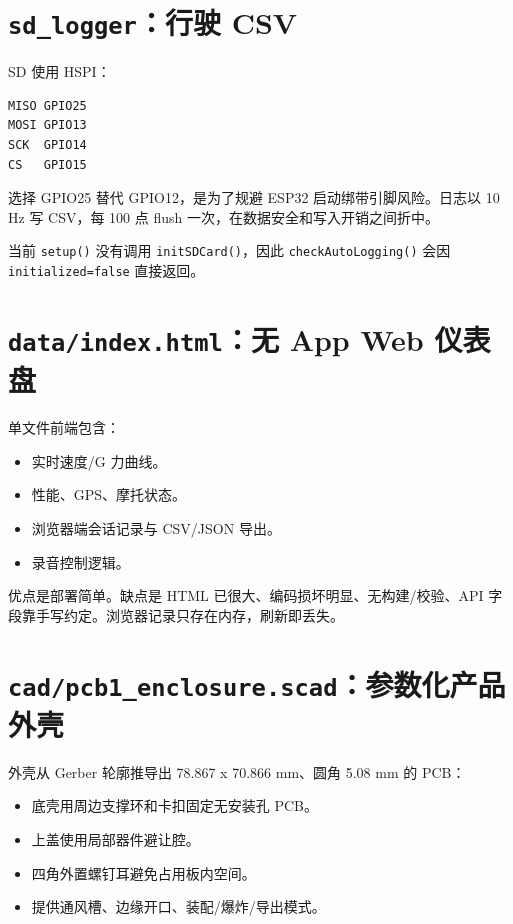 \documentclass[
  UTF8,11pt,a4paper]{ctexart}
\newcommand{\passthrough}[1]{#1}
\providecommand{\tightlist}{%
  \setlength{\itemsep}{0pt}\setlength{\parskip}{0pt}}
\begin{document}
\section{\texorpdfstring{\texttt{sd\_logger}：行驶
CSV}{sd\_logger：行驶 CSV}}\label{sd_loggerux884cux9a76-csv}

SD 使用 HSPI：

\begin{lstlisting}
MISO GPIO25
MOSI GPIO13
SCK  GPIO14
CS   GPIO15
\end{lstlisting}

选择 GPIO25 替代 GPIO12，是为了规避 ESP32 启动绑带引脚风险。日志以 10 Hz
写 CSV，每 100 点 flush 一次，在数据安全和写入开销之间折中。

当前 \passthrough{\lstinline!setup()!} 没有调用
\passthrough{\lstinline!initSDCard()!}，因此
\passthrough{\lstinline!checkAutoLogging()!} 会因
\passthrough{\lstinline!initialized=false!} 直接返回。

\section{\texorpdfstring{\texttt{data/index.html}：无 App Web
仪表盘}{data/index.html：无 App Web 仪表盘}}\label{dataindexhtmlux65e0-app-web-ux4eeaux8868ux76d8}

单文件前端包含：

\begin{itemize}
\tightlist
\item
  实时速度/G 力曲线。
\item
  性能、GPS、摩托状态。
\item
  浏览器端会话记录与 CSV/JSON 导出。
\item
  录音控制逻辑。
\end{itemize}

优点是部署简单。缺点是 HTML 已很大、编码损坏明显、无构建/校验、API
字段靠手写约定。浏览器记录只存在内存，刷新即丢失。

\section{\texorpdfstring{\texttt{cad/pcb1\_enclosure.scad}：参数化产品外壳}{cad/pcb1\_enclosure.scad：参数化产品外壳}}\label{cadpcb1_enclosurescadux53c2ux6570ux5316ux4ea7ux54c1ux5916ux58f3}

外壳从 Gerber 轮廓推导出 78.867 x 70.866 mm、圆角 5.08 mm 的 PCB：

\begin{itemize}
\tightlist
\item
  底壳用周边支撑环和卡扣固定无安装孔 PCB。
\item
  上盖使用局部器件避让腔。
\item
  四角外置螺钉耳避免占用板内空间。
\item
  提供通风槽、边缘开口、装配/爆炸/导出模式。
\end{itemize}
\end{document}

